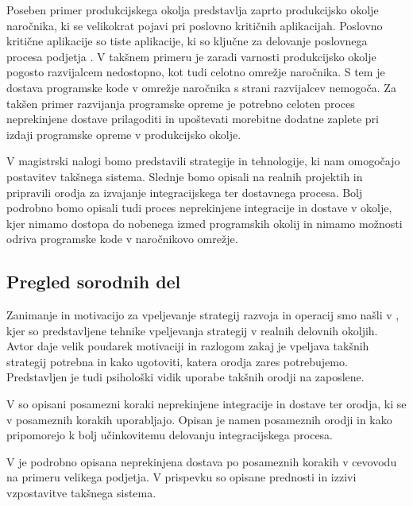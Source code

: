 \documentclass[a4paper, 12pt]{article}
\newcommand\cmnt[1]{\textcolor{munsell}{#1}}
\begin{document}
Poseben primer produkcijskega okolja predstavlja zaprto produkcijsko okolje naročnika, ki se velikokrat pojavi pri poslovno kritičnih aplikacijah. Poslovno kritične aplikacije so tiste aplikacije, ki so ključne za delovanje poslovnega procesa podjetja \cite{Hinchey2010, Syng2016}. V takšnem primeru je zaradi varnosti produkcijsko okolje pogosto razvijalcem nedostopno, kot tudi celotno omrežje naročnika. S tem je dostava programske kode v omrežje naročnika s strani razvijalcev nemogoča. Za takšen primer razvijanja programske opreme je potrebno celoten proces neprekinjene dostave prilagoditi in upoštevati morebitne dodatne zaplete pri izdaji programske opreme v produkcijsko okolje.

V magistrski nalogi bomo predstavili strategije in tehnologije, ki nam omogočajo postavitev takšnega sistema. Slednje bomo opisali na realnih projektih in pripravili orodja za izvajanje integracijskega ter dostavnega procesa. Bolj podrobno bomo opisali tudi proces neprekinjene integracije in dostave v okolje, kjer nimamo dostopa do nobenega izmed programskih okolij in nimamo možnosti odriva programske kode v naročnikovo omrežje.


\subsection{Pregled sorodnih del}


Zanimanje in motivacijo za vpeljevanje strategij razvoja in operacij smo našli v \cite{smith_2020}, kjer so predstavljene tehnike vpeljevanja strategij v realnih delovnih okoljih. Avtor daje velik poudarek motivaciji in razlogom zakaj je vpeljava takšnih strategij potrebna in kako ugotoviti, katera orodja zares potrebujemo. Predstavljen je tudi psihološki vidik uporabe takšnih orodji na zaposlene.

V \cite{Ebert2016} so opisani posamezni koraki neprekinjene integracije in dostave ter orodja, ki se v posameznih korakih uporabljajo. Opisan je namen posameznih orodji in kako pripomorejo k bolj učinkovitemu delovanju integracijskega procesa. 

V \cite{Chen2016} je podrobno opisana neprekinjena dostava po posameznih korakih v cevovodu na primeru velikega podjetja. V prispevku so opisane prednosti in izzivi vzpostavitve takšnega sistema.
\end{document}
